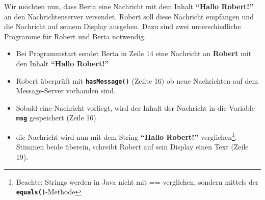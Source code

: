 \documentclass[
	12pt,
	article,
	type=bsc, %
	colorbacktitle,
	instlogo,
	accentcolor=tud1c,
	draft,
	german,
	twoside
]{tudexercise}
\newcommand{\solpath}[0]{../../impl/androidApp/app/src/main/java/org/mindroid/android/app/programs/workshop/solutions}
\newcommand{\bfcode}[1]{\texttt{\textbf{#1}}}
\begin{document}
	Wir möchten nun, dass Berta eine Nachricht mit dem Inhalt \textbf{``Hallo Robert!''} an den Nachrichtenserver versendet. Robert soll diese Nachricht empfangen und die Nachricht auf seinem Display ausgeben. 
	Dazu sind zwei unterschiedliche Programme für Robert und Berta notwendig.
	
	\begin{itemize}
	\item Bei Programmstart sendet Berta in Zeile 14 eine Nachricht an \textbf{Robert }mit den Inhalt \textbf{``Hallo Robert!''}
	\end{itemize}
	
	
	
	\begin{itemize}
	\item Robert überprüft mit \bfcode{hasMessage()} (Zeilte 16) ob neue Nachrichten auf dem Message-Server vorhanden sind. 
	\item Sobald eine Nachricht vorliegt, wird der Inhalt der Nachricht in die Variable \bfcode{msg} gespeichert (Zeile 16).
	\item die Nachricht wird nun mit dem String \textbf{``Hallo Robert!''} verglichen\footnote{Beachte: Strings werden in Java nicht mit == verglichen, sondern mittels der \bfcode{equals()}-Methode}. Stimmen beide überein, schreibt Robert auf sein Display einen Text (Zeile 19).
	\end{itemize}
	
\end{document}
